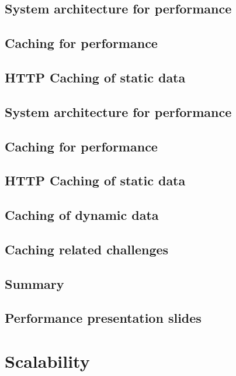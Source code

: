 \documentclass[11pt]{article}
\begin{document}
\section{System architecture for performance}

\section{Caching for performance}

\section{HTTP Caching of static data}

\section{System architecture for performance}

\section{Caching for performance}

\section{HTTP Caching of static data}

\section{Caching of dynamic data}

\section{Caching related challenges}

\section{Summary}

\section{Performance presentation slides}

\chapter{Scalability}
\end{document}
